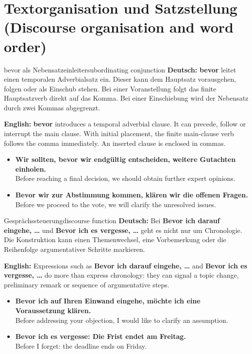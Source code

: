 \documentclass[a4paper,11pt]{article}
\newcommand{\GermanText}[1]{\textbf{Deutsch: }#1\par}
\newcommand{\EnglishText}[1]{{\small\color{SoftGray}\textbf{English: }#1\par}}
\newcommand{\ExampleItem}[2]{\item \textbf{#1}\\{\small\color{SoftGray}#2}}
\begin{document}
    \section{Textorganisation und Satzstellung (Discourse organisation and word order)}
        \begin{grammarentry}{bevor als Nebensatzeinleiter}{subordinating conjunction}
            \GermanText{\textbf{bevor} leitet einen temporalen Adverbialsatz ein. Dieser kann dem Hauptsatz vorausgehen, folgen oder als Einschub stehen. Bei einer Voranstellung folgt das finite Hauptsatzverb direkt auf das Komma. Bei einer Einschiebung wird der Nebensatz durch zwei Kommas abgegrenzt.}
            \EnglishText{\textbf{bevor} introduces a temporal adverbial clause. It can precede, follow or interrupt the main clause. With initial placement, the finite main-clause verb follows the comma immediately. An inserted clause is enclosed in commas.}
        \end{grammarentry}
        \begin{exbox}
            \begin{itemize}
                \ExampleItem{Wir sollten, bevor wir endgültig entscheiden, weitere Gutachten einholen.}{Before reaching a final decision, we should obtain further expert opinions.}
                \ExampleItem{Bevor wir zur Abstimmung kommen, klären wir die offenen Fragen.}{Before we proceed to the vote, we will clarify the unresolved issues.}
            \end{itemize}
        \end{exbox}
        \begin{grammarentry}{Gesprächssteuerung}{discourse function}
            \GermanText{Bei \textbf{Bevor ich darauf eingehe, \ldots{}} und \textbf{Bevor ich es vergesse, \ldots{}} geht es nicht nur um Chronologie. Die Konstruktion kann einen Themenwechsel, eine Vorbemerkung oder die Reihenfolge argumentativer Schritte markieren.}
            \EnglishText{Expressions such as \textbf{Bevor ich darauf eingehe, \ldots{}} and \textbf{Bevor ich es vergesse, \ldots{}} do more than express chronology: they can signal a topic change, preliminary remark or sequence of argumentative steps.}
        \end{grammarentry}
        \begin{exbox}
            \begin{itemize}
                \ExampleItem{Bevor ich auf Ihren Einwand eingehe, möchte ich eine Voraussetzung klären.}{Before addressing your objection, I would like to clarify an assumption.}
                \ExampleItem{Bevor ich es vergesse: Die Frist endet am Freitag.}{Before I forget: the deadline ends on Friday.}
            \end{itemize}
        \end{exbox}
\end{document}
